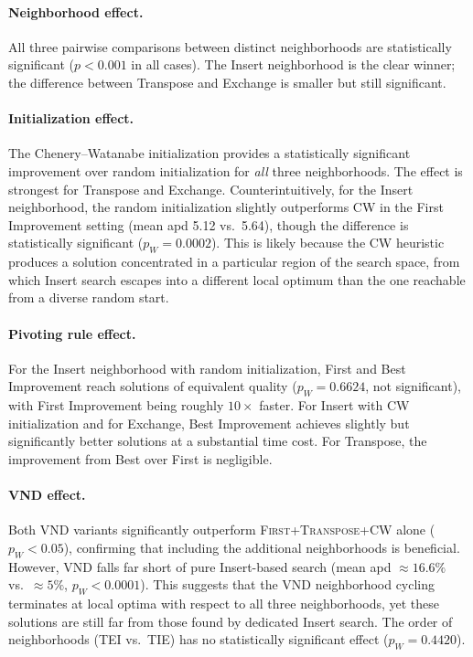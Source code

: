 \documentclass[11pt,a4paper]{article}
\begin{document}
\paragraph{Neighborhood effect.}
All three pairwise comparisons between distinct neighborhoods are
statistically significant ($p < 0.001$ in all cases).  The Insert
neighborhood is the clear winner; the difference between Transpose and
Exchange is smaller but still significant.

\paragraph{Initialization effect.}
The Chenery--Watanabe initialization provides a statistically significant
improvement over random initialization for \emph{all} three
neighborhoods.  The effect is strongest for Transpose and Exchange.
Counterintuitively, for the Insert neighborhood, the random initialization
slightly outperforms CW in the First Improvement setting (mean apd 5.12
vs.\ 5.64), though the difference is statistically significant
($p_W = 0.0002$).  This is likely because the CW heuristic produces a
solution concentrated in a particular region of the search space, from
which Insert search escapes into a different local optimum than the one
reachable from a diverse random start.

\paragraph{Pivoting rule effect.}
For the Insert neighborhood with random initialization, First and Best
Improvement reach solutions of equivalent quality ($p_W = 0.6624$, not
significant), with First Improvement being roughly $10\times$ faster.
For Insert with CW initialization and for Exchange, Best Improvement
achieves slightly but significantly better solutions at a substantial
time cost.  For Transpose, the improvement from Best over First is
negligible.

\paragraph{VND effect.}
Both VND variants significantly outperform
\textsc{First}+\textsc{Transpose}+\textsc{CW} alone ($p_W < 0.05$),
confirming that including the additional neighborhoods is beneficial.
However, VND falls far short of pure Insert-based search (mean apd
$\approx 16.6\%$ vs.\ $\approx 5\%$, $p_W < 0.0001$).  This suggests
that the VND neighborhood cycling terminates at local optima with respect
to all three neighborhoods, yet these solutions are still far from those
found by dedicated Insert search.  The order of neighborhoods (TEI vs.\
TIE) has no statistically significant effect ($p_W = 0.4420$).
\end{document}
